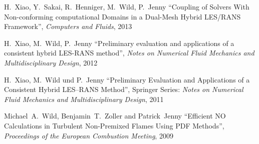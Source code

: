 \documentclass[line,11pt,a4paper]{../resume}
\begin{document}
\begin{resume}
\vspace{-3mm}
H.~Xiao, Y.~Sakai, R.~Henniger, M.~Wild, P.~Jenny
``Coupling of Solvers With Non-conforming computational Domains in a Dual-Mesh
Hybrid LES/RANS Framework'', \textsl{Computers and Fluids}, 2013

\vspace{-3mm}
H.~Xiao, M.~Wild, P.~Jenny
``Preliminary evaluation and applications of a consistent hybrid LES-RANS
method'', \textsl{Notes on Numerical Fluid Mechanics and Multidisciplinary
Design}, 2012

\vspace{-3mm}
H.~Xiao, M.~Wild und P.~Jenny ``Preliminary Evaluation and
Applications of a Consistent Hybrid LES--RANS Method'', Springer Series:
\textsl{Notes on Numerical Fluid Mechanics and Multidisciplinary Design}, 2011

\vspace{-3mm}
Michael~A.~Wild, Benjamin~T.~Zoller and Patrick~Jenny
``Efficient NO Calculations in Turbulent Non-Premixed Flames Using
PDF Methods'', \textsl{Proceedings of the European Combustion Meeting}, 2009



\end{resume}
\end{document}
